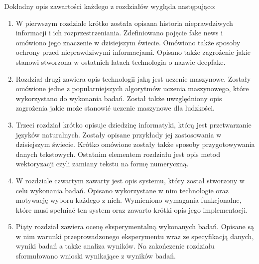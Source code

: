 Dokładny opis zawartości każdego z rozdziałów wygląda następująco:
\begin{enumerate}
    \item W pierwszym rozdziale krótko została opisana historia nieprawdziwych informacji 
    i ich rozprzestrzeniania. Zdefiniowano pojęcie fake news i omówiono jego znaczenie w
    dzisiejszym świecie. Omówiono także sposoby ochrony przed nieprawdziwymi informacjami.
    Opisano także zagrożenie jakie stanowi stworzona w ostatnich latach technologia o 
    nazwie deepfake.
    \item Rozdział drugi zawiera opis technologii jaką jest uczenie maszynowe. Zostały
    omówione jedne z popularniejszych algorytmów uczenia maszynowego, które wykorzystano
    do wykonania badań. Został także uwzględniony opis zagrożenia jakie może stanowić uczenie
    maszynowe dla ludzkości.
    \item Trzeci rozdział krótko opisuje dziedzinę informatyki, którą jest przetwarzanie 
    języków naturalnych. Zostały opisane przykłady jej zastosowania w dzisiejszym świecie.
    Krótko omówione zostały także sposoby przygotowywania danych tekstowych. Ostatnim elementem
    rozdziału jest opis metod wektoryzacji czyli zamiany tekstu na formę numeryczną. 
    \item W rozdziale czwartym zawarty jest opis systemu, który został 
    stworzony w celu wykonania badań. Opisano wykorzystane w nim technologie oraz motywację 
    wyboru każdego z nich. Wymieniono wymagania funkcjonalne, które musi spełniać ten system oraz
    zawarto krótki opis jego implementacji.
    \item Piąty rozdział zawiera ocenę eksperymentalną wykonanych badań. Opisane są w nim 
    warunki przeprowadzonego eksperymentu wraz ze specyfikacją danych, wyniki badań a także 
    analiza wyników. Na zakończenie rozdziału sformułowano wnioski wynikające z wyników badań.  
\end{enumerate}